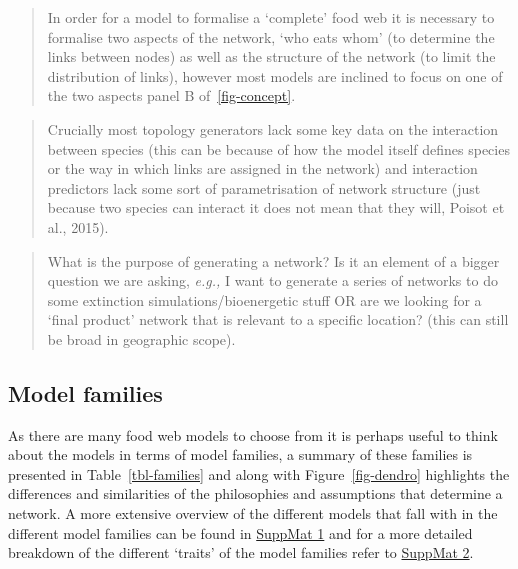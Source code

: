 \documentclass[
]{article}
\begin{document}
\begin{quote}
In order for a model to formalise a `complete' food web it is necessary
to formalise two aspects of the network, `who eats whom' (to determine
the links between nodes) as well as the structure of the network (to
limit the distribution of links), however most models are inclined to
focus on one of the two aspects panel B of~\ref{fig-concept}.
\end{quote}

\begin{quote}
Crucially most topology generators lack some key data on the interaction
between species (this can be because of how the model itself defines
species or the way in which links are assigned in the network) and
interaction predictors lack some sort of parametrisation of network
structure (just because two species can interact it does not mean that
they will, Poisot et al., 2015).
\end{quote}

\begin{quote}
What is the purpose of generating a network? Is it an element of a
bigger question we are asking, \emph{e.g.,} I want to generate a series
of networks to do some extinction simulations/bioenergetic stuff OR are
we looking for a `final product' network that is relevant to a specific
location? (this can still be broad in geographic scope).
\end{quote}

\subsection{Model families}\label{model-families}

As there are many food web models to choose from it is perhaps useful to
think about the models in terms of model families, a summary of these
families is presented in Table~\ref{tbl-families} and along with
Figure~\ref{fig-dendro} highlights the differences and similarities of
the philosophies and assumptions that determine a network. A more
extensive overview of the different models that fall with in the
different model families can be found in
\href{https://beckslab.github.io/ms_t_is_for_topology/notebooks/model_descriptions-preview.html}{SuppMat
1} and for a more detailed breakdown of the different `traits' of the
model families refer to
\href{https://beckslab.github.io/ms_t_is_for_topology/notebooks/model_qualitative-preview.html}{SuppMat
2}.
\end{document}
